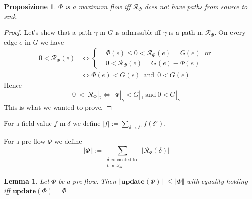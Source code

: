 \documentclass{article}
\theoremstyle{plain}
\newtheorem{prop}[teo]{Proposizione}
\newtheorem{lem}[teo]{Lemma}
\theoremstyle{definition}
\theoremstyle{remark}
\begin{document}
\begin{prop}
$\Phi$ is a maximum flow iff $\mathcal{R}_{\Phi}$ does not have paths from source to sink.
\end{prop}
\begin{proof}
Let's show that a path $\gamma$ in $G$ is admissible iff $\gamma$ is a path in $\mathcal{R}_{\Phi}$. On every edge $e$ in $G$ we have
\begin{equation*}
\begin{split}
0<{\mathcal{R}_{\Phi}}(e) &\Leftrightarrow
\begin{cases}
&\Phi(e) \leq 0 < {\mathcal{R}_{\Phi}}(e) = G(e)\ \  \ \text{or} \\
&0 <  {\mathcal{R}_{\Phi}}(e) = G(e) - \Phi(e)
\end{cases}\\
&\Leftrightarrow \Phi(e) < G(e) \ \  \text{and}\  \ 0<G(e)
\end{split}
\end{equation*}
Hence  
\begin{equation*}
0\ <\ {\mathcal{R}_{\Phi}}|_{\gamma} \Leftrightarrow\   \ \Phi|_{\gamma} < G|_{\gamma}\  \text{and}\  0< G|_{\gamma}
\end{equation*}
This is what we wanted to prove.
\end{proof}

For a field-value $f$ in $\delta$ we define $\displaystyle{|f|:=\sum_{\delta\mapsto\delta'}f(\delta')}$.

For a pre-flow $\Phi$ we define 
\begin{equation*}
\Vert \Phi \Vert:=\sum_{\substack{\delta \text{ connected to } \\ t    \text{ in } \mathcal{R}_{\Phi}}}|\mathcal{R}_{\Phi}(\delta)|
\end{equation*}

\begin{lem}
Let $\Phi$ be a pre-flow. Then  $\Vert \textbf{update}(\Phi) \Vert\ \leq \Vert \Phi \Vert$ with equality holding iff $\textbf{update}(\Phi)=\Phi$.
\end{lem}
\end{document}

